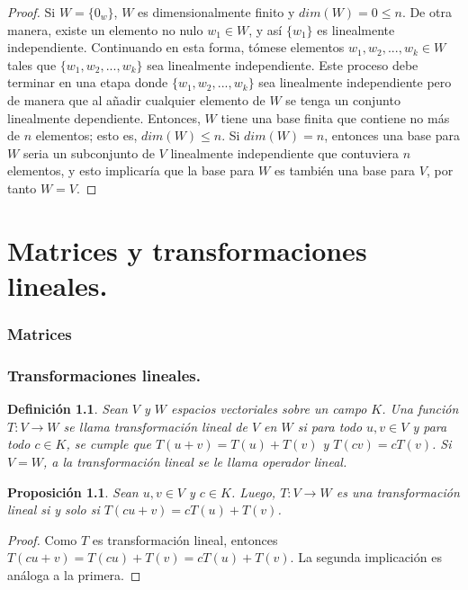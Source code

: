 \documentclass{book}
\newtheorem{proposition}{Proposición}
\newtheorem{definition}{Definición}
\begin{document}
\begin{proof}
Si $W=\{0_w\}$, $W$ es dimensionalmente finito y $dim(W)=0\leq n$. De otra manera, existe un elemento no nulo $w_1\in W$, y así $\{w_1\}$ es linealmente independiente. Continuando en esta forma, tómese elementos $w_1,w_2,...,w_k\in W$ tales que $\{w_1,w_2,...,w_k \}$ sea linealmente independiente. Este proceso debe terminar en una etapa donde $\{w_1,w_2,...,w_k \}$ sea linealmente independiente pero de manera que al añadir cualquier elemento de $W$ se tenga un conjunto linealmente dependiente. Entonces, $W$ tiene una base finita que contiene no más de $n$ elementos; esto es, $dim(W)\leq n$. Si $dim(W)=n$, entonces una base para $W$ seria un subconjunto de $V$ linealmente independiente que contuviera $n$ elementos, y esto implicaría que la base para $W$ es también una base para $V$, por tanto $W=V$.
\end{proof}

\chapter{Matrices y transformaciones lineales.}
\subsection{Matrices}
\subsection{Transformaciones lineales.}

\begin{definition}
Sean $V$ y $W$ espacios vectoriales sobre un campo $K$. Una función $T:V\rightarrow W$ se llama transformación lineal de $V$ en $W$ si para todo $u,v\in V$ y para todo $c\in K$, se cumple que $T(u+v)=T(u)+T(v)$ y $T(cv)=cT(v)$. Si $V=W$, a la transformación lineal se le llama operador lineal.

\end{definition}

\begin{proposition}

Sean $u,v\in V$ y $c\in K$. Luego, $T:V\rightarrow W$ es una transformación lineal si y solo si $T(cu+v)=cT(u)+T(v)$.

\end{proposition}

\begin{proof}

Como $T$ es transformación lineal, entonces $T(cu+v)=T(cu)+T(v)=cT(u)+T(v)$. La segunda implicación es análoga a la primera.

\end{proof}
\end{document}
